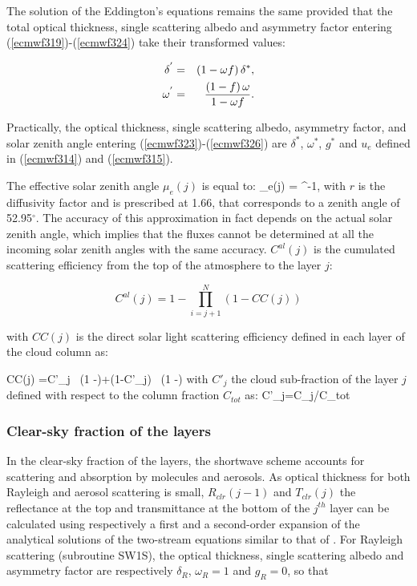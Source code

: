 The solution of the Eddington's equations remains the same provided that the total optical thickness, single scattering albedo and asymmetry factor entering (\ref{ecmwf319})-(\ref{ecmwf324}) take their transformed values:

\medskip
\begin{eqnarray}\label{ecmwf326}
\delta^{'} &=& (1 - \omega f) \, \delta^{*}, \cr
\omega^{'}  &=& \frac{(1 - f) \, \omega}{1 - \omega f}.
\end{eqnarray}

Practically, the optical thickness, single scattering albedo, asymmetry factor,
and solar zenith angle entering (\ref{ecmwf323})-(\ref{ecmwf326}) are $\delta^{*}$, $\omega^{*}$, $g^{*}$ and $u_e$ defined in (\ref{ecmwf314}) and (\ref{ecmwf315}).


The effective solar zenith angle $\mu_e(j)$ is equal to:
\medskip
\be
\mu_e(j) = ^{-1},
\label{ecmwf315}
\ee
with $r$ is the diffusivity factor and is prescribed at 1.66, that corresponds to a zenith angle of 52.95$^\circ$. The accuracy of this approximation in fact depends on the actual solar zenith angle, which implies that the fluxes cannot be determined at all the incoming solar zenith angles with the same accuracy. $C^{al}(j)$ is the cumulated scattering efficiency from the top of the atmosphere to the layer $j$:
\noindent

\[
C^{al}(j) = 1 - \prod_{i=j+1}^N{(1 - CC(j))}
\]

\noindent
with $CC(j)$ is the direct solar light scattering efficiency defined in each layer of the cloud column as:

\be
CC(j) =C'_j \, (1 -\exp{})+(1-C'_j) \, (1 -\exp{} )
\label{ecmwf316a}
\ee
\medskip
with $C'_j$ the cloud sub-fraction of the layer $j$
defined with respect to the column fraction $C_{tot}$ as:
\be
C'_j=C_j/C_{tot}		
\ee

%
\subsubsection{Clear-sky fraction of the layers}
%
In the clear-sky fraction of the layers, the shortwave scheme accounts for scattering and absorption by molecules and aerosols. As optical thickness for both Rayleigh and aerosol scattering is small, $R_{clr}(j-1)$ and $T_{clr}(j)$ the reflectance at the top and transmittance at the bottom of the $j^{th}$ layer can be calculated using respectively a first and a second-order expansion of the analytical solutions of the two-stream equations similar to that of \citet{Coakley1975}. For Rayleigh scattering (subroutine SW1S), the optical thickness, single scattering albedo and asymmetry factor are respectively $\delta_R$, $\omega_R = 1$ and $g_R = 0$, so that

